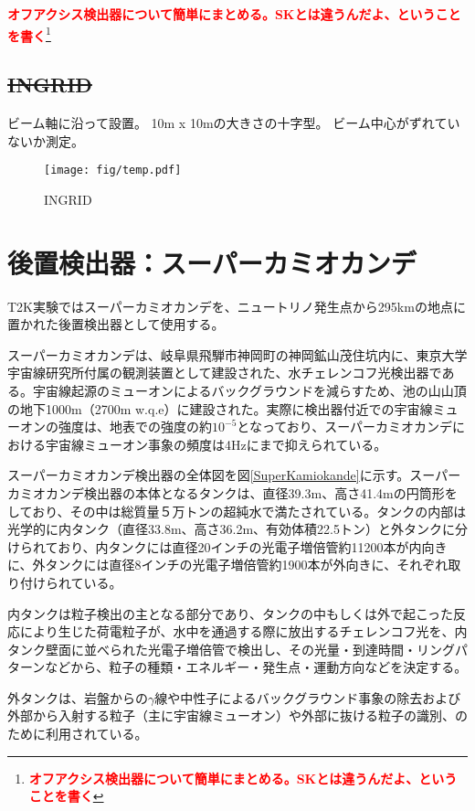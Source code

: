 \documentclass[11pt]{ltjsreport}
\newcommand{\figref}[1]{図\ref{#1}}
\newcommand{\red}[1]{\textcolor{red}{\textbf{#1}}}
\newcommand{\comment}[1]{\red{#1}\footnote{\red{#1}}}
\begin{document}
\comment{オフアクシス検出器について簡単にまとめる。SKとは違うんだよ、ということを書く}
\fi


\subsection{\sout{INGRID}}
ビーム軸に沿って設置。
10m x 10mの大きさの十字型。
ビーム中心がずれていないか測定。

\begin{figure}[htb]
\centering
\texttt{[image: fig/temp.pdf]}
\caption[INGRID]{INGRID}
\label{INGRID}
\end{figure}

\fi %


\newpage
\section{後置検出器：スーパーカミオカンデ}

T2K実験ではスーパーカミオカンデを、ニュートリノ発生点から295kmの地点に置かれた後置検出器として使用する。

スーパーカミオカンデは、岐阜県飛騨市神岡町の神岡鉱山茂住坑内に、東京大学宇宙線研究所付属の観測装置として建設された、水チェレンコフ光検出器である。宇宙線起源のミューオンによるバックグラウンドを減らすため、池の山山頂の地下1000m（2700m w.q.e）に建設された。実際に検出器付近での宇宙線ミューオンの強度は、地表での強度の約$10^{-5}$となっており、スーパーカミオカンデにおける宇宙線ミューオン事象の頻度は4Hzにまで抑えられている。

スーパーカミオカンデ検出器の全体図を\figref{SuperKamiokande}に示す。スーパーカミオカンデ検出器の本体となるタンクは、直径39.3m、高さ41.4mの円筒形をしており、その中は総質量５万トンの超純水で満たされている。タンクの内部は光学的に内タンク（直径33.8m、高さ36.2m、有効体積22.5トン）と外タンクに分けられており、内タンクには直径20インチの光電子増倍管約11200本が内向きに、外タンクには直径8インチの光電子増倍管約1900本が外向きに、それぞれ取り付けられている。

内タンクは粒子検出の主となる部分であり、タンクの中もしくは外で起こった反応により生じた荷電粒子が、水中を通過する際に放出するチェレンコフ光を、内タンク壁面に並べられた光電子増倍管で検出し、その光量・到達時間・リングパターンなどから、粒子の種類・エネルギー・発生点・運動方向などを決定する。

外タンクは、岩盤からの$\gamma$線や中性子によるバックグラウンド事象の除去および外部から入射する粒子（主に宇宙線ミューオン）や外部に抜ける粒子の識別、のために利用されている。
\end{document}
